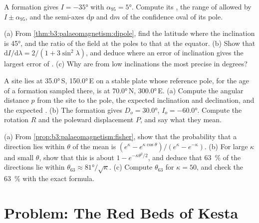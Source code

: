 \begin{exercise}[$\star\star$]\label{exo:b3:palaeomagnetism:9}
A formation gives $I = \ang{-35}$ with $\alpha_{95} = \ang{5}$. Compute its
, the range of  allowed by $I \pm \alpha_{95}$,
and the semi-axes $\mathrm dp$ and $\mathrm dm$ of the confidence oval of its
pole.
\end{exercise}

\begin{exercise}[$\star\star\star$]\label{exo:b3:palaeomagnetism:10}
(a) From \cref{thm:b3:palaeomagnetism:dipole}, find the latitude where the
inclination is \ang{45}, and the ratio of the field at the poles to that at the
equator. (b) Show that $\mathrm dI/\mathrm d\lambda = 2/(1 + 3\sin^2\lambda)$,
and deduce where an error of inclination gives the largest error of
. (c) Why are  from low inclinations the most
precise in degrees?
\end{exercise}

\begin{exercise}[$\star\star\star$]\label{exo:b3:palaeomagnetism:11}
A site lies at \ang{35.0}\,S, \ang{150.0}\,E on a stable plate whose reference
pole, for the age of a formation sampled there, is at \ang{70.0}\,N,
\ang{300.0}\,E. (a) Compute the angular distance $p$ from the site to the pole,
the expected inclination and declination, and the expected .
(b) The formation gives $D_o = \ang{30.0}$, $I_o = \ang{-60.0}$. Compute the
rotation $R$ and the poleward displacement $P$, and say what they mean.
\end{exercise}

\begin{exercise}[$\star\star\star$]\label{exo:b3:palaeomagnetism:12}
(a) From \cref{prop:b3:palaeomagnetism:fisher}, show that the probability that
a direction lies within $\theta$ of the mean is $(e^\kappa -
e^{\kappa\cos\theta})/(e^\kappa - e^{-\kappa})$. (b) For large $\kappa$ and
small $\theta$, show that this is about $1 - e^{-\kappa\theta^2/2}$, and deduce
that \qty{63}{\percent} of the directions lie within $\theta_{63} \approx
\ang{81}/\sqrt\kappa$. (c) Compute $\theta_{63}$ for $\kappa = 50$, and check the
\qty{63}{\percent} with the exact formula.
\end{exercise}

\section{Problem: The Red Beds of Kesta}

